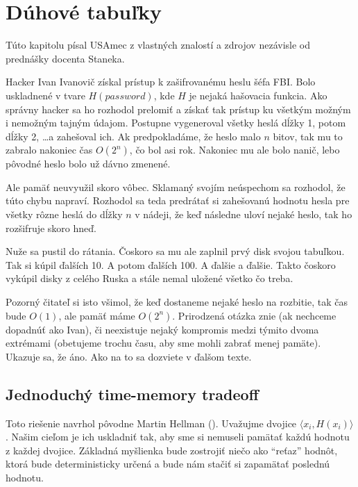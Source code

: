 \section{Dúhové tabuľky}

\begin{poznamka}
    Túto kapitolu písal USAmec z vlastných znalostí a zdrojov
    nezávisle od prednášky docenta Staneka.
\end{poznamka}

Hacker Ivan Ivanovič získal prístup k zašifrovanému heslu šéfa FBI.
Bolo uskladnené v tvare $H(password)$, kde $H$ je nejaká hašovacia funkcia.
Ako správny hacker sa ho rozhodol prelomiť a získať tak prístup
ku všetkým možným i nemožným tajným údajom.
Postupne vygeneroval všetky heslá dĺžky 1, potom dĺžky 2, \dots a
zahešoval ich.
Ak predpokladáme, že heslo malo $n$ bitov,
tak mu to zabralo nakoniec čas $O(2^n)$,
čo bol asi rok. Nakoniec mu ale bolo nanič, lebo pôvodné heslo bolo už
dávno zmenené.

Ale pamäť neuvyužil skoro vôbec.
Sklamaný svojím neúspechom sa rozhodol, že túto chybu napraví.
Rozhodol sa teda predrátať si zahešovanú hodnotu hesla
pre všetky rôzne heslá do dĺžky $n$ v nádeji,
že keď následne uloví nejaké heslo, tak ho rozšifruje skoro hneď.

Nuže sa pustil do rátania. Čoskoro sa mu ale zaplnil prvý disk svojou tabuľkou.
Tak si kúpil ďalších 10. A potom ďalších 100. A ďalšie a ďalšie.
Takto čoskoro vykúpil disky z celého Ruska
a stále nemal uložené všetko čo treba.

Pozorný čitateľ si isto všimol, že keď dostaneme nejaké heslo na rozbitie,
tak čas bude $O(1)$, ale pamäť máme $O(2^n)$.
Prirodzená otázka znie (ak nechceme dopadnúť ako Ivan),
či neexistuje nejaký kompromis medzi týmito dvoma extrémami
(obetujeme trochu času, aby sme mohli zabrať menej pamäte).
Ukazuje sa, že áno. Ako na to sa dozviete v ďalšom texte.

\subsection{Jednoduchý time-memory tradeoff}

Toto riešenie navrhol pôvodne Martin Hellman (\cite{hellman1980}).
Uvažujme dvojice $\langle x_i, H(x_i) \rangle$.
Našim cieľom je ich uskladniť tak, aby sme si nemuseli
pamätať každú hodnotu z každej dvojice. 
Základná myšlienka bude zostrojiť niečo ako ``reťaz'' hodnôt, ktorá
bude deterministicky určená a bude nám stačiť si zapamätať poslednú
hodnotu.

